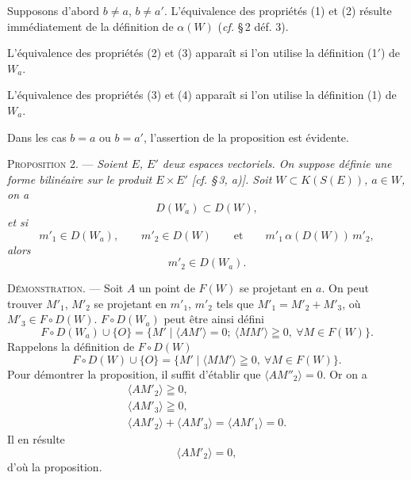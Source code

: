 \documentclass[11pt]{article}
\newcommand{\bzcf}[2]{#1}
\newenvironment{prop}[1][]{\par\medskip\noindent\textsc{Proposition #1.} --- \itshape}{\par\medskip}
\newenvironment{proof}[1][]{\par}{\par}
\begin{document}
\begin{proof}
Supposons d'abord $b\neq a$, $b\neq a'$. L'équivalence des propriétés (1) et (2) résulte
immédiatement de la définition de $\alpha(W)$ (\bzcf{\textit{cf.} \S\,2
déf. 3}{\ref{bzdef:c3s2d3_fibre_cylindriquement}}).

L'équivalence des propriétés (2) et (3) apparaît si l'on utilise \bzcf{la définition
(1$'$)}{\ref{bzdef:c3s4d1prime_cone_appui_demi_droites}} de $W_a$.

L'équivalence des propriétés (3) et (4) apparaît si l'on utilise \bzcf{la définition
(1)}{\ref{bzdef:c3s4d1_cone_appui}} de $W_a$.

Dans les cas $b=a$ ou $b=a'$, l'assertion de la proposition est évidente.
\end{proof}

\begin{prop}[2]
Soient $E$, $E'$ deux espaces vectoriels. On suppose définie une forme bilinéaire sur le produit
$E\times E'$ [\textit{cf.} \S\,3, \textit{a})]. Soit $W\subset K(S(E))$, $a\in W$, on a
\[ D(W_a)\subset D(W), \]
et si
\[ m'_1\in D(W_a),\qquad m'_2\in D(W)\qquad\text{et}\qquad m'_1\,\alpha(D(W))\,m'_2, \]
alors
\[ m'_2\in D(W_a). \]
\end{prop}

\begin{proof}
\textsc{Démonstration.} --- Soit $A$ un point de $F(W)$ se projetant en $a$. On peut trouver
$M'_1$, $M'_2$ se projetant en $m'_1$, $m'_2$ tels que $M'_1=M'_2+M'_3$, où
$M'_3\in F\circ D(W)$. $F\circ D(W_a)$ peut être ainsi défini
\[ F\circ D(W_a)\cup\{O\}=\{M'\mid\langle AM'\rangle=0;\ \langle MM'\rangle\geqq 0,\ \forall M\in
F(W)\}. \]
Rappelons la définition de $F\circ D(W)$
\[ F\circ D(W)\cup\{O\}=\{M'\mid\langle MM'\rangle\geqq 0,\ \forall M\in F(W)\}. \]
Pour démontrer la proposition, il suffit d'établir que $\langle AM''_2\rangle=0$. Or on a
\[ \begin{gathered} \langle AM'_2\rangle\geqq 0,\\ \langle AM'_3\rangle\geqq 0,\\
\langle AM'_2\rangle+\langle AM'_3\rangle=\langle AM'_1\rangle=0. \end{gathered} \]
Il en résulte
\[ \langle AM'_2\rangle=0, \]
d'où la proposition.
\end{proof}
\end{document}
